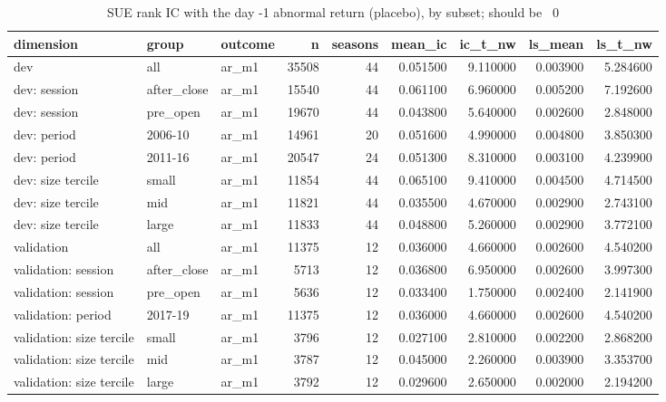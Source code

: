 \begin{table}
\caption{SUE rank IC with the day -1 abnormal return (placebo), by subset; should be ~0}
\label{tab:cd_placebo_diagnostic}
\begin{tabular}{lllrrrrrr}
\toprule
dimension & group & outcome & n & seasons & mean\_ic & ic\_t\_nw & ls\_mean & ls\_t\_nw \\
\midrule
dev & all & ar\_m1 & 35508 & 44 & 0.051500 & 9.110000 & 0.003900 & 5.284600 \\
dev: session & after\_close & ar\_m1 & 15540 & 44 & 0.061100 & 6.960000 & 0.005200 & 7.192600 \\
dev: session & pre\_open & ar\_m1 & 19670 & 44 & 0.043800 & 5.640000 & 0.002600 & 2.848000 \\
dev: period & 2006-10 & ar\_m1 & 14961 & 20 & 0.051600 & 4.990000 & 0.004800 & 3.850300 \\
dev: period & 2011-16 & ar\_m1 & 20547 & 24 & 0.051300 & 8.310000 & 0.003100 & 4.239900 \\
dev: size tercile & small & ar\_m1 & 11854 & 44 & 0.065100 & 9.410000 & 0.004500 & 4.714500 \\
dev: size tercile & mid & ar\_m1 & 11821 & 44 & 0.035500 & 4.670000 & 0.002900 & 2.743100 \\
dev: size tercile & large & ar\_m1 & 11833 & 44 & 0.048800 & 5.260000 & 0.002900 & 3.772100 \\
validation & all & ar\_m1 & 11375 & 12 & 0.036000 & 4.660000 & 0.002600 & 4.540200 \\
validation: session & after\_close & ar\_m1 & 5713 & 12 & 0.036800 & 6.950000 & 0.002600 & 3.997300 \\
validation: session & pre\_open & ar\_m1 & 5636 & 12 & 0.033400 & 1.750000 & 0.002400 & 2.141900 \\
validation: period & 2017-19 & ar\_m1 & 11375 & 12 & 0.036000 & 4.660000 & 0.002600 & 4.540200 \\
validation: size tercile & small & ar\_m1 & 3796 & 12 & 0.027100 & 2.810000 & 0.002200 & 2.868200 \\
validation: size tercile & mid & ar\_m1 & 3787 & 12 & 0.045000 & 2.260000 & 0.003900 & 3.353700 \\
validation: size tercile & large & ar\_m1 & 3792 & 12 & 0.029600 & 2.650000 & 0.002000 & 2.194200 \\
\bottomrule
\end{tabular}
\end{table}
